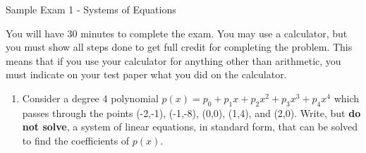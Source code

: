 \documentclass[14pt]{article}
\begin{document}
\begin{center}
Sample Exam 1 - Systems of Equations
\end{center}

You will have 30 minutes to complete the exam.  You may use a calculator, but you must show all steps done to get full credit for completing the problem.  This means that if you use your calculator for anything other than arithmetic, you must indicate on your test paper what you did on the calculator.

\begin{enumerate}
\item 
%
%
Consider a degree 4 polynomial $ p(x) = p_0 + p_1x + p_2x^2 + p_3x^3 + p_4x^4 $ which passes through the points (-2,-1), (-1,-8), (0,0), (1,4), and (2,0).  Write, but {\bf do not solve}, a system of linear equations, in standard form, that can be solved to find the coefficients of $ p(x) $.
%
%
%
%
%
%
%


\end{enumerate}
\end{document}
